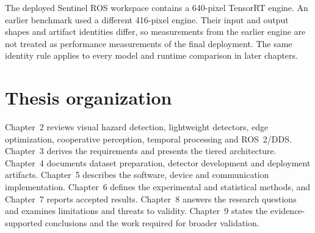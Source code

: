 The deployed Sentinel ROS workspace contains a 640-pixel TensorRT engine. An
earlier benchmark used a different 416-pixel engine. Their input and output
shapes and artifact identities differ, so measurements from the earlier engine
are not treated as performance measurements of the final deployment. The same
identity rule applies to every model and runtime comparison in later chapters.

\section{Thesis organization}
\label{sec:introduction:organization}

Chapter~2 reviews visual hazard detection, lightweight detectors, edge
optimization, cooperative perception, temporal processing and ROS~2/DDS.
Chapter~3 derives the requirements and presents the tiered architecture.
Chapter~4 documents dataset preparation, detector development and deployment
artifacts. Chapter~5 describes the software, device and communication
implementation. Chapter~6 defines the experimental and statistical methods,
and Chapter~7 reports accepted results. Chapter~8 answers the research
questions and examines limitations and threats to validity. Chapter~9 states
the evidence-supported conclusions and the work required for broader
validation.
